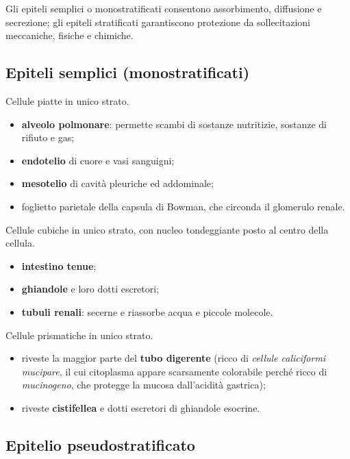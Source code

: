 Gli epiteli semplici o monostratificati consentono assorbimento, diffusione e secrezione; gli epiteli stratificati garantiscono protezione da sollecitazioni meccaniche, fisiche e chimiche.

\subsection{Epiteli semplici (monostratificati)}

Cellule piatte in unico strato.
\begin{itemize}
  \item \textbf{alveolo polmonare}: permette scambi di sostanze nutritizie, sostanze di rifiuto e gas;
  \item \textbf{endotelio} di cuore e vasi sanguigni;
  \item \textbf{mesotelio} di cavità pleuriche ed addominale;
  \item foglietto parietale della capsula di Bowman, che circonda il glomerulo renale.
\end{itemize}

Cellule cubiche in unico strato, con nucleo tondeggiante posto al centro della cellula.
\begin{itemize}
  \item \textbf{intestino tenue};
  \item \textbf{ghiandole} e loro dotti escretori;
  \item \textbf{tubuli renali}: secerne e riassorbe acqua e piccole molecole.
\end{itemize}

Cellule prismatiche in unico strato.
\begin{itemize}
  \item riveste la maggior parte del \textbf{tubo digerente} (ricco di \textit{cellule caliciformi mucipare}, il cui citoplasma appare scarsamente colorabile perché ricco di \textit{mucinogeno}, che protegge la mucosa dall'acidità gastrica);
  \item riveste \textbf{cistifellea} e dotti escretori di ghiandole esocrine.
\end{itemize}

\subsection{Epitelio pseudostratificato}

